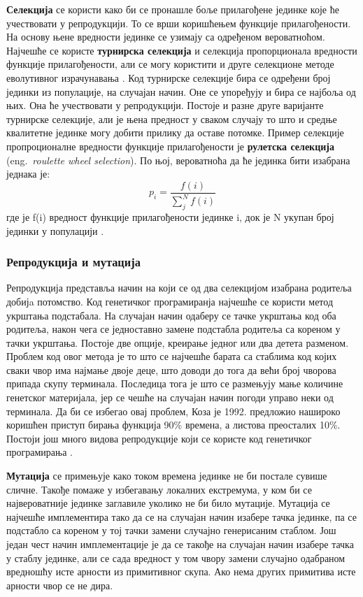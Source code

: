 \documentclass[a4paper]{article}
\begin{document}
\textbf{Селекција} се користи како би се пронашле боље прилагођене јединке које ће учествовати у репродукцији. То се врши коришћењем функције прилагођености. На основу њене вредности јединке се узимају са одређеном вероватноћом. Најчешће се користе \textbf{турнирска селекција} и селекција пропорционала вредности функције прилагођености, али се могу користити и друге селекционе методе еволутивног израчунавања \cite{compIntelligence}. Код турнирске селекције бира се одређени број јединки из популације, на случајан начин. Оне се упоређују и бира се најбоља од њих. Она ће учествовати у репродукцији. Постоје и разне друге варијанте турнирске селекције, али је њена предност у сваком случају то што и средње квалитетне јединке могу добити прилику да оставе потомке. Пример селекције пропроционалне вредности функције прилагођености је \textbf{рулетска селекција} (eng.~{\em roulette wheel selection}). По њој, вероватноћа да ће јединка бити изабрана једнака је: 
\begin{equation} 
    p_i = \frac{f(i)}{\sum_{j}^{N} f(i)}
\end{equation}
где је f(i) вредност функције прилагођености јединке i, док је N укупан број јединки у популацији \cite{vi}.

\subsubsection{Репродукција и мутација}

Репродукција представља начин на који се од два селекцијом изабрана родитеља добијa потомство. Код генетичког програмиранја најчешће се користи метод укрштања подстабала. На случајан начин одаберу се тачке укрштања код оба родитеља, након чега се једноставно замене подстабла родитеља са кореном у тачки укрштања. Постоје две опције, креирање једног или два детета разменом. Проблем код овог метода је то што се најчешће барата са стаблима код којих сваки чвор има најмање двоје деце, што доводи до тога да већи број чворова припада скупу терминала. Последица тога је што се размењују мање количине генетског материјала, јер се чешће на случајан начин погоди управо неки од терминала. Да би се избегао овај проблем, Коза је 1992. предложио нашироко коришћен приступ бирања функција 90\% времена, а листова преосталих 10\%. Постоји још много видова репродукције који се користе код генетичког програмирања \cite{fieldGuidetoGP}.\newline

\textbf{Мутација} се примењује како током времена јединке не би постале сувише сличне. Такође помаже у избегавању локалних екстремума, у ком би се највероватније јединке заглавиле уколико не би било мутације.
Мутација се најчешће имплементира тако да се на случајан начин изабере тачка јединке, па се подстабло са кореном у тој тачки замени случајно генерисаним стаблом. Још један чест начин имплементације је да се такође на случајан начин изабере тачка у стаблу јединке, али се сада вредност у том чвору замени случајно одабраном вредношћу исте арности из примитивног скупа. Ако нема других примитива исте арности чвор се не дира. 
\end{document}
